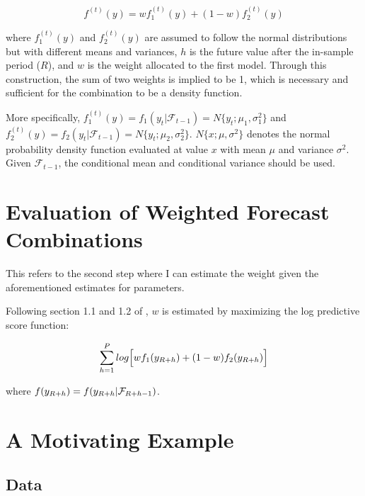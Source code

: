 \documentclass{monashthesis}
\begin{document}
\begin{equation}
f^{(t)}(y) = wf^{(t)}_1(y) + (1-w)f^{(t)}_2(y)
\end{equation}

where \(f^{(t)}_1(y)\) and \(f^{(t)}_2(y)\) are assumed to follow the normal distributions but with different means and variances, \(h\) is the future value after the in-sample period (\(R\)), and \(w\) is the weight allocated to the first model. Through this construction, the sum of two weights is implied to be 1, which is necessary and sufficient for the combination to be a density function\autocite{GA11}.

More specifically, \(f^{(t)}_1(y)=f_1(y_t|\mathcal{F}_{t-1})=N\{y_t; \mu_1, \sigma^2_1\}\) and \(f^{(t)}_2(y)=f_2(y_t|\mathcal{F}_{t-1})=N\{y_t; \mu_2, \sigma^2_2\}\). \(N\{x; \mu, \sigma^2\}\) denotes the normal probability density function evaluated at value \(x\) with mean \(\mu\) and variance \(\sigma^2\). Given \(\mathcal{F}_{t-1}\), the conditional mean and conditional variance should be used.

\hypertarget{evaluation-of-weighted-forecast-combinations}{%
\section{Evaluation of Weighted Forecast Combinations}\label{evaluation-of-weighted-forecast-combinations}}

This refers to the second step where I can estimate the weight given the aforementioned estimates for parameters.

Following section 1.1 and 1.2 of \textcite{GA11}, \(w\) is estimated by maximizing the log predictive score function:

\begin{equation}
\sum^P_{h=1}log\Big[wf_1(y_{\small{R+h}}) + (1-w)f_2(y_{\small{R+h}})\Big]
\end{equation}

where \(f(y_{\small{R+h}}) = f(y_{\small{R+h}}|\mathcal{F}_{\small{R+h-1}})\).

\hypertarget{a-motivating-example}{%
\section{A Motivating Example}\label{a-motivating-example}}

\hypertarget{data}{%
\subsection{Data}\label{data}}
\end{document}
